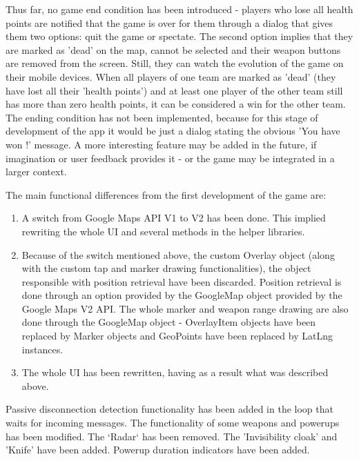 Thus far, no game end condition has been introduced - players who lose all
health points are notified that the game is over for them through a dialog that
gives them two options: quit the game or spectate. The second option implies
that they are marked as 'dead' on the map, cannot be selected and their weapon
buttons are removed from the screen. Still, they can watch the evolution of the
game on their mobile devices. When all players of one team are marked as 'dead'
(they have lost all their 'health points') and at least one player of the other
team still has more than zero health points, it can be considered a win for the
other team. The ending condition has not been implemented, because for this
stage of development of the app it would be just a dialog stating the obvious
'You have won !' message. A more interesting feature may be added in the future,
if imagination or user feedback provides it - or the game may be integrated in a
larger context.\newline

The main functional differences from the first development of the game are:

\begin{enumerate}
  \item A switch from Google Maps API V1 to V2 has been done. This implied
  rewriting the whole UI and several methods in the helper libraries.
  
  \item Because of the switch mentioned above, the custom Overlay object (along
  with the custom tap and marker drawing functionalities), the object
  responsible with position retrieval have been discarded. Position retrieval is
  done through an option provided by the GoogleMap object provided by the Google
  Maps V2 API. The whole marker and weapon range drawing are also done through
  the GoogleMap object - OverlayItem objects have been replaced by Marker
  objects and GeoPoints have been replaced by LatLng instances.
  
  \item The whole UI has been rewritten, having as a result what was described
  above.  
  
\end{enumerate}

Passive disconnection detection functionality has been added in the loop that
waits for incoming messages. The functionality of some weapons and powerups has
been modified. The `Radar` has been removed. The 'Invisibility cloak' and
'Knife' have been added. Powerup duration indicators have been added.\newline

